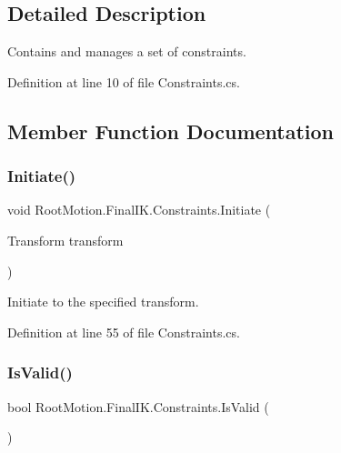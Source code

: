\subsection{Detailed Description}
Contains and manages a set of constraints. 



Definition at line 10 of file Constraints.\+cs.



\subsection{Member Function Documentation}
\mbox{\label{class_root_motion_1_1_final_i_k_1_1_constraints_ab342972a3cf7e338078b0676a0ae7197}} 
\subsubsection{\texorpdfstring{Initiate()}{Initiate()}}
{\footnotesize\ttfamily void Root\+Motion.\+Final\+I\+K.\+Constraints.\+Initiate (\begin{DoxyParamCaption}\item[{Transform}]{transform }\end{DoxyParamCaption})}



Initiate to the specified transform. 



Definition at line 55 of file Constraints.\+cs.

\mbox{\label{class_root_motion_1_1_final_i_k_1_1_constraints_ab86c3dc8dc072a9841cc047d4faae59d}} 
\subsubsection{\texorpdfstring{Is\+Valid()}{IsValid()}}
{\footnotesize\ttfamily bool Root\+Motion.\+Final\+I\+K.\+Constraints.\+Is\+Valid (\begin{DoxyParamCaption}{ }\end{DoxyParamCaption})}



